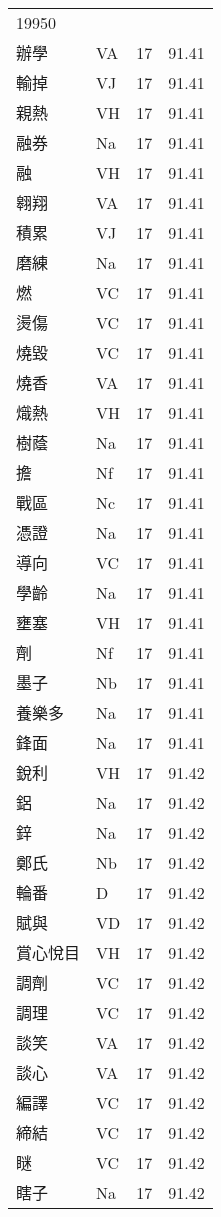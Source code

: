 \documentclass[twocolumn]{book}
\begin{document}
\begin{supertabular}{llrr}
19950\\
辦學 & VA & 17 &  91.41\\
輸掉 & VJ & 17 &  91.41\\
親熱 & VH & 17 &  91.41\\
融券 & Na & 17 &  91.41\\
融 & VH & 17 &  91.41\\
翱翔 & VA & 17 &  91.41\\
積累 & VJ & 17 &  91.41\\
磨練 & Na & 17 &  91.41\\
燃 & VC & 17 &  91.41\\
燙傷 & VC & 17 &  91.41\\
燒毀 & VC & 17 &  91.41\\
燒香 & VA & 17 &  91.41\\
熾熱 & VH & 17 &  91.41\\
樹蔭 & Na & 17 &  91.41\\
擔 & Nf & 17 &  91.41\\
戰區 & Nc & 17 &  91.41\\
憑證 & Na & 17 &  91.41\\
導向 & VC & 17 &  91.41\\
學齡 & Na & 17 &  91.41\\
壅塞 & VH & 17 &  91.41\\
劑 & Nf & 17 &  91.41\\
墨子 & Nb & 17 &  91.41\\
養樂多 & Na & 17 &  91.41\\
鋒面 & Na & 17 &  91.41\\
銳利 & VH & 17 &  91.42\\
鋁 & Na & 17 &  91.42\\
鋅 & Na & 17 &  91.42\\
鄭氏 & Nb & 17 &  91.42\\
輪番 & D & 17 &  91.42\\
賦與 & VD & 17 &  91.42\\
賞心悅目 & VH & 17 &  91.42\\
調劑 & VC & 17 &  91.42\\
調理 & VC & 17 &  91.42\\
談笑 & VA & 17 &  91.42\\
談心 & VA & 17 &  91.42\\
編譯 & VC & 17 &  91.42\\
締結 & VC & 17 &  91.42\\
瞇 & VC & 17 &  91.42\\
瞎子 & Na & 17 &  91.42\\

\end{supertabular}
\end{document}
